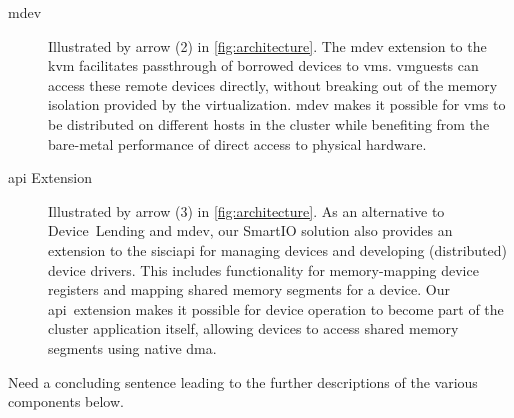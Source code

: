\begin{description}
    \item[\gls{mdev}] Illustrated by arrow {\textsf{(2)}} in \cref{fig:architecture}.
        The \gls{mdev} extension to the \gls{kvm} facilitates \gls{passthrough} of borrowed devices to \glspl{vm}.
        \Glspl{vmguest} can access these remote devices directly, without breaking out of the memory isolation provided by the virtualization.
        \Gls{mdev} makes it possible for \glspl{vm} to be distributed on different \glspl{host} in the cluster while benefiting from the bare-metal performance of direct access to physical hardware.

    \item[\gls{api} Extension] Illustrated by arrow {\textsf{(3)}} in \cref{fig:architecture}.
        As an alternative to Device~Lending and \gls{mdev}, our SmartIO solution also provides an extension to the \gls{sisciapi} for managing devices and developing (distributed) device drivers.
        This includes functionality for memory-mapping device registers and mapping shared memory segments for a device.
        Our \gls{api}~extension makes it possible for device operation to become part of the cluster application itself, allowing devices to access shared memory segments using native \gls{dma}.


\end{description}


Need a concluding sentence leading to the further descriptions of the various components below.









